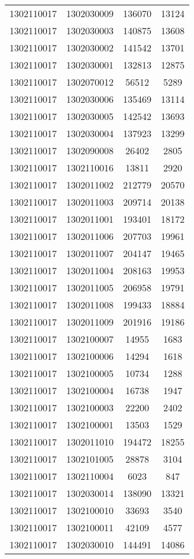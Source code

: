 \begin{longtable}{llcc}
1302110017 & 1302030009 & 136070 & 13124\\
1302110017 & 1302030003 & 140875 & 13608\\
1302110017 & 1302030002 & 141542 & 13701\\
1302110017 & 1302030001 & 132813 & 12875\\
1302110017 & 1302070012 & 56512 & 5289\\
1302110017 & 1302030006 & 135469 & 13114\\
1302110017 & 1302030005 & 142542 & 13693\\
1302110017 & 1302030004 & 137923 & 13299\\
1302110017 & 1302090008 & 26402 & 2805\\
1302110017 & 1302110016 & 13811 & 2920\\
1302110017 & 1302011002 & 212779 & 20570\\
1302110017 & 1302011003 & 209714 & 20138\\
1302110017 & 1302011001 & 193401 & 18172\\
1302110017 & 1302011006 & 207703 & 19961\\
1302110017 & 1302011007 & 204147 & 19465\\
1302110017 & 1302011004 & 208163 & 19953\\
1302110017 & 1302011005 & 206958 & 19791\\
1302110017 & 1302011008 & 199433 & 18884\\
1302110017 & 1302011009 & 201916 & 19186\\
1302110017 & 1302100007 & 14955 & 1683\\
1302110017 & 1302100006 & 14294 & 1618\\
1302110017 & 1302100005 & 10734 & 1288\\
1302110017 & 1302100004 & 16738 & 1947\\
1302110017 & 1302100003 & 22200 & 2402\\
1302110017 & 1302100001 & 13503 & 1529\\
1302110017 & 1302011010 & 194472 & 18255\\
1302110017 & 1302101005 & 28878 & 3104\\
1302110017 & 1302110004 & 6023 & 847\\
1302110017 & 1302030014 & 138090 & 13321\\
1302110017 & 1302100010 & 33693 & 3540\\
1302110017 & 1302100011 & 42109 & 4577\\
1302110017 & 1302030010 & 144491 & 14086\\

\end{longtable}
